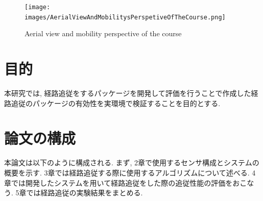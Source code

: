 \begin{figure}[H]
  \centering
 \texttt{[image: images/AerialViewAndMobilitysPerspetiveOfTheCourse.png]}
 \caption{Aerial view and mobility perspective of the course}
 \label{fig:course}
\end{figure}


\section{目的}
本研究では, 経路追従をするパッケージを開発して評価を行うことで作成した経路追従のパッケージの有効性を実環境で検証することを目的とする.


\section{論文の構成}
本論文は以下のように構成される.
まず, 2章で使用するセンサ構成とシステムの概要を示す.
3章では経路追従する際に使用するアルゴリズムについて述べる.
4章では開発したシステムを用いて経路追従をした際の追従性能の評価をおこなう.
5章では経路追従の実験結果をまとめる.

\newpage
